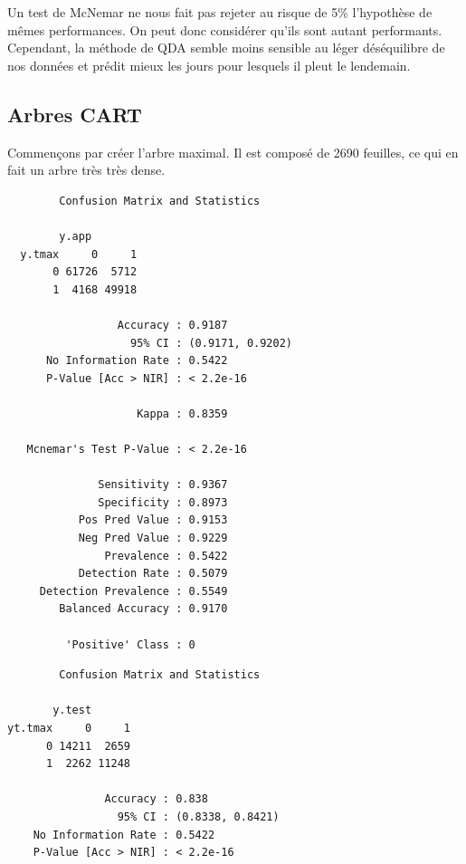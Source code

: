\documentclass{article}
\begin{document}
Un test de McNemar ne nous fait pas rejeter au risque de 5\% l'hypothèse de mêmes performances. On peut donc considérer qu'ils sont autant performants. Cependant, la méthode de QDA semble moins sensible au léger déséquilibre de nos données et prédit mieux les jours pour lesquels il pleut le lendemain. 

\subsection{Arbres CART}

Commençons par créer l'arbre maximal. Il est composé de 2690 feuilles, ce qui en fait un arbre très très dense. 
\begin{multicols}{2}
    \begin{verbatim}
        Confusion Matrix and Statistics

        y.app
  y.tmax     0     1
       0 61726  5712
       1  4168 49918
                                            
                 Accuracy : 0.9187          
                   95% CI : (0.9171, 0.9202)
      No Information Rate : 0.5422          
      P-Value [Acc > NIR] : < 2.2e-16       
                                            
                    Kappa : 0.8359          
                                            
   Mcnemar's Test P-Value : < 2.2e-16       
                                            
              Sensitivity : 0.9367          
              Specificity : 0.8973          
           Pos Pred Value : 0.9153          
           Neg Pred Value : 0.9229          
               Prevalence : 0.5422          
           Detection Rate : 0.5079          
     Detection Prevalence : 0.5549          
        Balanced Accuracy : 0.9170          
                                            
         'Positive' Class : 0    
    \end{verbatim}
    \begin{verbatim}
        Confusion Matrix and Statistics

       y.test
yt.tmax     0     1
      0 14211  2659
      1  2262 11248
                                          
               Accuracy : 0.838           
                 95% CI : (0.8338, 0.8421)
    No Information Rate : 0.5422          
    P-Value [Acc > NIR] : < 2.2e-16       
                                          

\end{verbatim}
\end{multicols}
\end{document}
